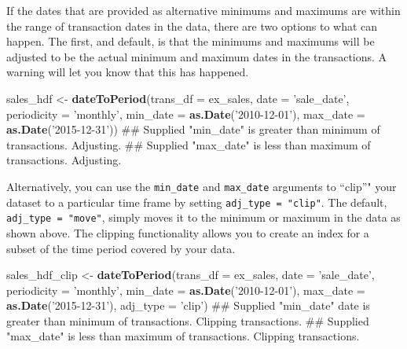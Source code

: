 \documentclass[]{article}
\newenvironment{Shaded}{\begin{snugshade}}{\end{snugshade}}
\newcommand{\KeywordTok}[1]{\textcolor[rgb]{0.13,0.29,0.53}{\textbf{#1}}}
\newcommand{\DataTypeTok}[1]{\textcolor[rgb]{0.13,0.29,0.53}{#1}}
\newcommand{\StringTok}[1]{\textcolor[rgb]{0.31,0.60,0.02}{#1}}
\newcommand{\NormalTok}[1]{#1}
\begin{document}
If the dates that are provided as alternative minimums and maximums are
within the range of transaction dates in the data, there are two options
to what can happen. The first, and default, is that the minimums and
maximums will be adjusted to be the actual minimum and maximum dates in
the transactions. A warning will let you know that this has happened.

\begin{Shaded}
\begin{Highlighting}[]
\NormalTok{  sales_hdf <-}\StringTok{ }\KeywordTok{dateToPeriod}\NormalTok{(}\DataTypeTok{trans_df =}\NormalTok{ ex_sales,}
                            \DataTypeTok{date =} \StringTok{'sale_date'}\NormalTok{,}
                            \DataTypeTok{periodicity =} \StringTok{'monthly'}\NormalTok{,}
                            \DataTypeTok{min_date =} \KeywordTok{as.Date}\NormalTok{(}\StringTok{'2010-12-01'}\NormalTok{),}
                            \DataTypeTok{max_date =} \KeywordTok{as.Date}\NormalTok{(}\StringTok{'2015-12-31'}\NormalTok{))}
\NormalTok{## Supplied "min_date" is greater than minimum of transactions. Adjusting.}
\NormalTok{## Supplied "max_date" is less than maximum of transactions. Adjusting.}
\end{Highlighting}
\end{Shaded}

Alternatively, you can use the \texttt{min\_date} and \texttt{max\_date}
arguments to ``clip''" your dataset to a particular time frame by
setting \texttt{adj\_type\ =\ "clip"}. The default,
\texttt{adj\_type\ =\ "move"}, simply moves it to the minimum or maximum
in the data as shown above. The clipping functionality allows you to
create an index for a subset of the time period covered by your data.

\begin{Shaded}
\begin{Highlighting}[]
\NormalTok{  sales_hdf_clip <-}\StringTok{ }\KeywordTok{dateToPeriod}\NormalTok{(}\DataTypeTok{trans_df =}\NormalTok{ ex_sales,}
                                 \DataTypeTok{date =} \StringTok{'sale_date'}\NormalTok{,}
                                 \DataTypeTok{periodicity =} \StringTok{'monthly'}\NormalTok{,}
                                 \DataTypeTok{min_date =} \KeywordTok{as.Date}\NormalTok{(}\StringTok{'2010-12-01'}\NormalTok{),}
                                 \DataTypeTok{max_date =} \KeywordTok{as.Date}\NormalTok{(}\StringTok{'2015-12-31'}\NormalTok{),}
                                 \DataTypeTok{adj_type =} \StringTok{'clip'}\NormalTok{)}
\NormalTok{## Supplied "min_date" date is greater than minimum of transactions. Clipping transactions.}
\NormalTok{## Supplied "max_date" is less than maximum of transactions. Clipping transactions.}
\end{Highlighting}
\end{Shaded}
\end{document}

